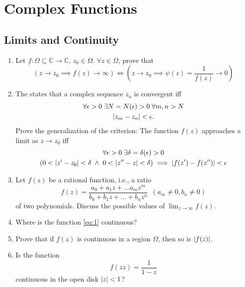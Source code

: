 \documentclass[11pt, oneside]{book}
\begin{document}


\chapter{Complex Functions}
	\label{chapter:complex_functions}

\section{Limits and Continuity} %
\label{sec:limits_and_continuity}

\begin{enumerate}
	\item Let $f : \Omega \subseteq \mathbb{C} \to \mathbb{C}$, $z_0 \in \Omega$. $\forall z \in \Omega$, prove that
	\begin{equation*}
		(z \to z_0 \implies f(z) \to \infty) \iff (z \to z_0 \implies \psi(z) = \frac{1}{f(z)} \to 0)
	\end{equation*}

	\item The  states that a complex sequence $z_n$ is convergent iff
	\begin{gather*}
		\forall \epsilon > 0 \; \exists N = N(\epsilon) > 0 \; \forall m, n > N \\
		\left|z_m - z_n\right| < \epsilon.
	\end{gather*}
	Prove the generalization of the criterion: The function $f(z)$ approaches a limit as $z \to z_0$ iff
	\begin{gather*}
		\forall \epsilon > 0 \; \exists \delta = \delta(\epsilon) > 0 \\
		(0 < \left|z' - z_0\right| < \delta \; \land \; 0 < \left|z'' - z\right| < \delta) \implies \left|f(z') - f(z'')\right| < \epsilon
	\end{gather*}

	\item Let $f(z)$ be a rational function, i.e., a ratio
	\begin{equation}\label{eq:1}
		f(z) = \frac{a_0 + a_1 z + \hdots a_m z^m}{b_0 + b_1z + \hdots + b_n z^n} \enspace (a_m \neq 0, b_n \neq 0)
	\end{equation}
	of two polynomials. Discuss the possible values of $\lim_{z \to \infty} f(z)$.

	\item Where is the function \cref{eq:1} continuous?

	\item Prove that if $f(z)$ is continuous in a region $\Omega$, then so is $\left|f(z)\right|$.

	\item Is the function
	\begin{equation*}
		f(zz) = \frac{1}{1 - z}
	\end{equation*}
	continuous in the open disk $\left|z\right| < 1$?
\end{enumerate}


\end{document}
